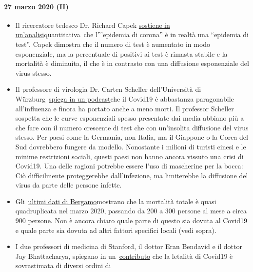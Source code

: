 \hypertarget{27-marzo-2020-ii}{%
\paragraph{27 marzo 2020 (II)}\label{27-marzo-2020-ii}}

\begin{itemize}
\tightlist
\item
  Il ricercatore tedesco Dr. Richard Capek
  \href{https://coronadaten.wordpress.com/}{sostiene in
  un'analisi}quantitativa~che l'''epidemia di corona'' è in realtà una
  ``epidemia di test''. Capek dimostra che il numero di test è aumentato
  in modo esponenziale, ma la percentuale di positivi ai test è rimasta
  stabile e la mortalità è diminuita, il che è in contrasto con una
  diffusione esponenziale del virus stesso.
\item
  Il professore di virologia Dr. Carten Scheller dell'Università di
  Würzburg~\href{https://www.youtube.com/watch?v=w-uub0urNfw}{spiega in
  un podcast}che il Covid19 è abbastanza paragonabile all'influenza e
  finora ha portato anche a meno morti. Il professor Scheller sospetta
  che le curve esponenziali spesso presentate dai media abbiano più a
  che fare con il numero crescente di test che con un'insolita
  diffusione del virus stesso. Per paesi come la Germania, non Italia,
  ma il Giappone o la Corea del Sud dovrebbero fungere da modello.
  Nonostante i milioni di turisti cinesi e le minime restrizioni
  sociali, questi paesi non hanno ancora vissuto una crisi di Covid19.
  Una delle ragioni potrebbe essere l'uso di mascherine per la bocca:
  Ciò difficilmente proteggerebbe dall'infezione, ma limiterebbe la
  diffusione del virus da parte delle persone infette.
\item
  Gli~\href{https://www.ecodibergamo.it/stories/bergamo-citta/a-bergamo-decessi-4-volte-oltre-la-medialeco-lancia-unindagine-nei-comuni_1346651_11/}{ultimi
  dati di Bergamo}mostrano che la mortalità totale è quasi quadruplicata
  nel marzo 2020, passando da 200 a 300 persone al mese a circa 900
  persone. Non è ancora chiaro quale parte di questo sia dovuta al
  Covid19 e quale parte sia dovuta ad altri fattori specifici locali
  (vedi sopra).
\item
  I due professori di medicina di Stanford, il dottor Eran Bendavid e il
  dottor Jay Bhattacharya, spiegano in
  un~\href{https://web.archive.org/web/20200325103650/https://www.wsj.com/articles/is-the-coronavirus-as-deadly-as-they-say-11585088464}{contributo}
  che la letalità di Covid19 è sovrastimata di diversi ordini di

\end{itemize}
